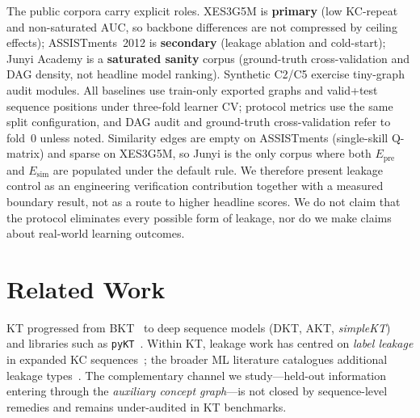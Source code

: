 \documentclass[preprint,10pt,doubleblind]{elsarticle}
\newcommand{\Epre}{\ensuremath{E_{\text{pre}}}}
\newcommand{\Esim}{\ensuremath{E_{\text{sim}}}}
\begin{document}
The public corpora carry explicit roles. XES3G5M is \textbf{primary} (low
KC-repeat and non-saturated AUC, so backbone differences are not compressed by
ceiling effects); ASSISTments~2012 is \textbf{secondary} (leakage ablation and
cold-start); Junyi Academy is a \textbf{saturated sanity} corpus (ground-truth
cross-validation and DAG density, not headline model ranking). Synthetic C2/C5
exercise tiny-graph audit modules. All baselines use train-only exported graphs
and valid+test sequence positions under three-fold learner CV; protocol metrics
use the same split configuration, and DAG audit and ground-truth
cross-validation refer to fold~0 unless noted. Similarity edges are empty on
ASSISTments (single-skill Q-matrix) and sparse on XES3G5M, so Junyi is the only
corpus where both $\Epre$ and $\Esim$ are populated under the default rule.
We therefore present leakage control as an engineering verification
contribution together with a measured boundary result, not as a route to
higher headline scores. We do not claim that the protocol eliminates
every possible form of leakage, nor do we make claims about real-world
learning outcomes.
\section{Related Work}
\label{sec:related}
KT progressed from BKT~\cite{corbett1995bkt} to deep sequence models
(DKT, AKT, \textit{simpleKT})~\cite{piech2015dkt,ghosh2020akt,liu2023simplekt}
and libraries such as \texttt{pyKT}~\cite{liu2022pykt,abdelrahman2023kt_survey}.
Within KT, leakage work has centred on \emph{label leakage} in expanded KC
sequences~\cite{liu2022pykt,badran2024labelleakage}; the broader ML literature
catalogues additional leakage types~\cite{kaufman2012leakage,kapoor2023leakage}.
The complementary channel we study---held-out information entering through the
\emph{auxiliary concept graph}---is not closed by sequence-level remedies and
remains under-audited in KT benchmarks.
\end{document}
